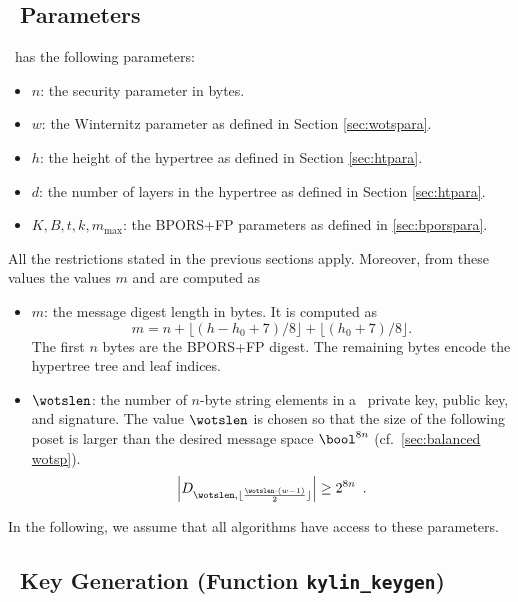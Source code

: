 \subsection{\SPHINCSA\ Parameters}

\SPHINCSA\ has the following parameters:

\begin{itemize}

    \item $n$: the security parameter in bytes.

    \item $w$: the Winternitz parameter as defined in Section \ref{sec:wotspara}.
    
    \item $h$: the height of the hypertree as defined in Section \ref{sec:htpara}.
    
    \item $d$: the number of layers in the hypertree as defined in Section \ref{sec:htpara}.
    
    \item $K,B,t,k,m_{\max}$: the BPORS+FP parameters as defined in
    \cref{sec:bporspara}.
    
\end{itemize}

All the restrictions stated in the previous sections apply.  Moreover, from
these values the values $m$ and \wotslen are computed as

\begin{itemize}
    \item $m$: the message digest length in bytes. It is computed as
    $$
    m=n+\lfloor(h-h_0+7)/8\rfloor+\lfloor(h_0+7)/8\rfloor.
    $$
    The first $n$ bytes are the BPORS+FP digest.  The remaining bytes encode
    the hypertree tree and leaf indices.
    
    \item $\wotslen$: the number of $n$-byte string elements in a \WOTSCS\ private key, public key, and signature. The value $\wotslen$ is chosen so that the size of the following poset is larger than the desired message space $\bool^{8n}$ (cf.~\cref{sec:balanced wotsp}).
    \[\left| D_{ \wotslen, \lfloor \frac{\wotslen \cdot (w-1)}{2} \rfloor } \right| \geq 2^{8n} \enspace. \]

\end{itemize}
In the following, we assume that all algorithms have access to these parameters.

\subsection{\SPHINCSA\ Key Generation (Function \texttt{kylin\_keygen})}

